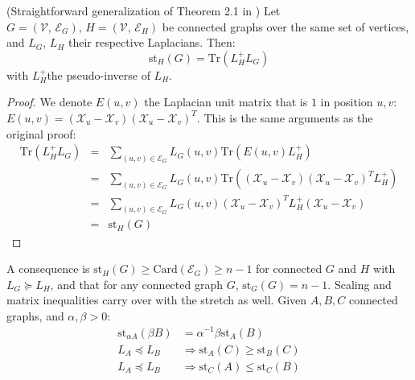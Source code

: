 \begin{lemma}\label{lem:stretch-trace}(Straightforward generalization
of Theorem 2.1 in \cite{Spielman2009b}) Let $G=\left(\mathcal{V},\,\mathcal{E}_{G}\right),\, H=\left(\mathcal{V},\,\mathcal{E}_{H}\right)$
be connected graphs over the same set of vertices, and $L_{G}$, $L_{H}$
their respective Laplacians. Then: 
\[
\text{st}_{H}\left(G\right)=\text{Tr}\left(L_{H}^{+}L_{G}\right)
\]
with $L_{H}^{+}$the pseudo-inverse of $L_{H}$.

\end{lemma}

\begin{proof}

We denote $E\left(u,v\right)$ the Laplacian unit matrix that is $1$
in position $u,v$: $E\left(u,v\right)=\left(\mathcal{X}_{u}-\mathcal{X}_{v}\right)\left(\mathcal{X}_{u}-\mathcal{X}_{v}\right)^{T}$.
This is the same arguments as the original proof: 
\begin{eqnarray*}
\text{Tr}\left(L_{H}^{+}L_{G}\right) & = & \sum_{\left(u,v\right)\in\mathcal{E}_{G}}L_{G}\left(u,v\right)\text{Tr}\left(E\left(u,v\right)L_{H}^{+}\right)\\
 & = & \sum_{\left(u,v\right)\in\mathcal{E}_{G}}L_{G}\left(u,v\right)\text{Tr}\left(\left(\mathcal{X}_{u}-\mathcal{X}_{v}\right)\left(\mathcal{X}_{u}-\mathcal{X}_{v}\right)^{T}L_{H}^{+}\right)\\
 & = & \sum_{\left(u,v\right)\in\mathcal{E}_{G}}L_{G}\left(u,v\right)\left(\mathcal{X}_{u}-\mathcal{X}_{v}\right)^{T}L_{H}^{+}\left(\mathcal{X}_{u}-\mathcal{X}_{v}\right)\\
 & = & \text{st}_{H}\left(G\right)
\end{eqnarray*}


\end{proof}

A consequence is $\text{st}_{H}\left(G\right)\geq\text{Card}\left(\mathcal{E}_{G}\right)\geq n-1$
for connected $G$ and $H$ with $L_{G}\succeq L_{H}$, and that for
any connected graph $G$, $\text{st}_{G}\left(G\right)=n-1$. Scaling
and matrix inequalities carry over with the stretch as well. Given
$A,B,C$ connected graphs, and $\alpha,\beta>0$: 
\begin{align*}
\text{st}_{\alpha A}\left(\beta B\right) & =\alpha^{-1}\beta\text{st}_{A}\left(B\right)\\
L_{A}\preceq L_{B} & \Rightarrow\text{st}_{A}\left(C\right)\geq\text{st}_{B}\left(C\right)\\
L_{A}\preceq L_{B} & \Rightarrow\text{st}_{C}\left(A\right)\leq\text{st}_{C}\left(B\right)
\end{align*}



